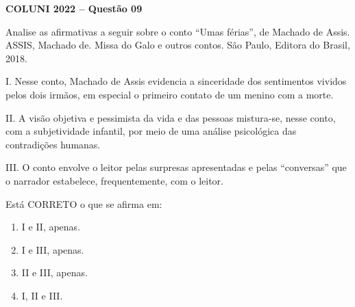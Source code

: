 \textbf{COLUNI 2022 -- Questão 09}\par\medskip Analise as afirmativas a seguir sobre o conto “Umas férias”, de Machado de Assis. ASSIS, Machado de. Missa do Galo e outros contos. São Paulo, Editora do Brasil, 2018.

\par

I. Nesse conto, Machado de Assis evidencia a sinceridade dos sentimentos vividos pelos dois irmãos, em especial o primeiro contato de um menino com a morte.\par
II. A visão objetiva e pessimista da vida e das pessoas mistura-se, nesse conto, com a subjetividade infantil, por meio de uma análise psicológica das contradições humanas.\par
III. O conto envolve o leitor pelas surpresas apresentadas e pelas “conversas” que o narrador estabelece, frequentemente, com o leitor.

\par

Está CORRETO o que se afirma em:\begin{enumerate}
\item I e II, apenas.
\item I e III, apenas.
\item II e III, apenas.
\item I, II e III.\end{enumerate}
